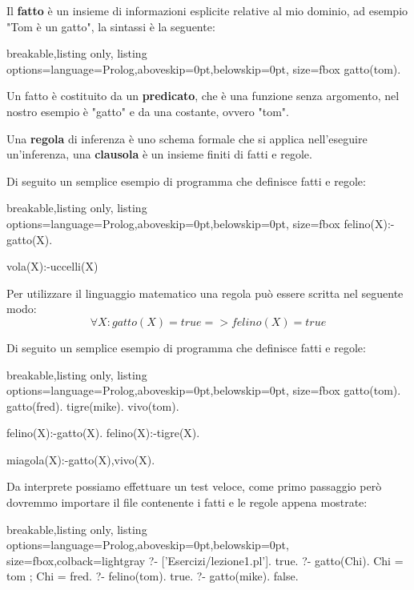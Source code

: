 Il \textbf{fatto} è un insieme di informazioni esplicite relative al mio dominio, ad esempio "Tom è un gatto", la sintassi è la seguente:
\begin{tcblisting}{breakable,listing only, listing options={language=Prolog,aboveskip=0pt,belowskip=0pt}, size=fbox}
gatto(tom).
\end{tcblisting}
Un fatto è costituito da un \textbf{predicato}, che è una funzione senza argomento, nel nostro esempio è "gatto" e da una costante, ovvero "tom".

Una \textbf{regola} di inferenza è uno schema formale che si applica nell'eseguire un'inferenza, una \textbf{clausola} è un insieme finiti di fatti e regole.

Di seguito un semplice esempio di programma che definisce fatti e regole:
\begin{tcblisting}{breakable,listing only, listing options={language=Prolog,aboveskip=0pt,belowskip=0pt}, size=fbox}
felino(X):-gatto(X).

vola(X):-uccelli(X)
\end{tcblisting}

Per utilizzare il linguaggio matematico una regola può essere scritta nel seguente modo:
\begin{displaymath}
\forall X : gatto(X) = true => felino(X) = true
\end{displaymath}

Di seguito un semplice esempio di programma che definisce fatti e regole:
\begin{tcblisting}{breakable,listing only, listing options={language=Prolog,aboveskip=0pt,belowskip=0pt}, size=fbox}
gatto(tom).
gatto(fred).
tigre(mike).
vivo(tom).

felino(X):-gatto(X).
felino(X):-tigre(X).

miagola(X):-gatto(X),vivo(X).
\end{tcblisting}

Da interprete possiamo effettuare un test veloce, come primo passaggio però dovremmo importare il file contenente i fatti e le regole appena mostrate:

\begin{tcblisting}{breakable,listing only, 
    listing options={language=Prolog,aboveskip=0pt,belowskip=0pt}, size=fbox,colback=lightgray}
?- ['Esercizi/lezione1.pl'].
true.
?- gatto(Chi).
Chi = tom ;
Chi = fred.
?- felino(tom). %
true.
?- gatto(mike). 
false.
\end{tcblisting}

